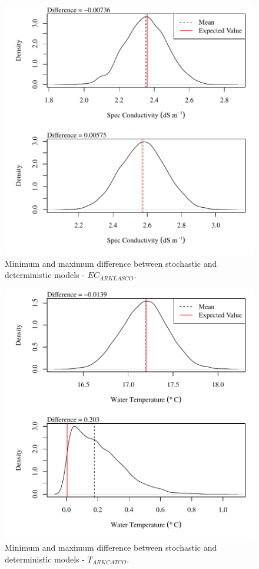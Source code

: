 \begin{center}
\begin{figure}[htbp]
	\includegraphics[width=6in]{"Figures/Results_USR/V min-max diff ecout"}
	\caption{Minimum and maximum difference between stochastic and deterministic models - $EC_{ARKLASCO}$.}
\end{figure}
\end{center}
\newpage

\begin{center}
\begin{figure}[htbp]
	\includegraphics[width=6in]{"Figures/Results_USR/V min-max diff tin"}
	\caption{Minimum and maximum difference between stochastic and deterministic models - $T_{ARKCATCO}$.}
\end{figure}
\end{center}
\newpage

